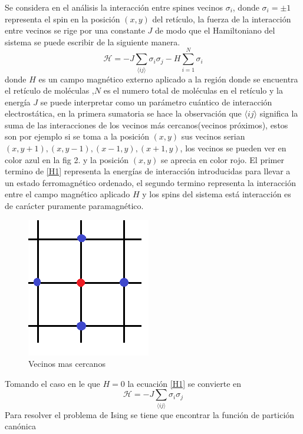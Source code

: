 \documentclass[a4paper]{article}
\begin{document}
Se considera en el análisis la interacción entre spines vecinos $\sigma_{i}$, donde $\sigma_i=\pm1$ representa el spin en la  posición $(x,y)$ del retículo, la fuerza de la interacción entre vecinos se rige por una constante $J$ de modo que el Hamiltoniano del sistema se puede escribir de la siguiente manera.
\begin{equation}
\label{H1}
\mathcal{H}=-J\sum_{\langle i j\rangle}\sigma_i \sigma_j-H\sum_{i=1}^{N}\sigma_i
\end{equation}
donde $H$ es un campo magnético externo aplicado a la región donde se encuentra el retículo de moléculas ,$N$ es el numero total de moléculas en el retículo y la energía $J$ se puede interpretar como un parámetro cuántico de interacción electrostática, en la primera sumatoria se hace la observación que $\langle i j\rangle$ significa la suma de las interacciones de los vecinos más cercanos(vecinos próximos), estos son por ejemplo si se toma a la posición $(x,y)$ sus vecinos serian ${(x,y+1),(x,y-1),(x-1,y),(x+1,y)}$, los vecinos se pueden ver en color azul en la fig 2. y la posición $(x,y)$ se aprecia en color rojo. El primer termino de \ref{H1} representa la energías de interacción introducidas para llevar a un estado ferromagnético ordenado, el segundo termino representa la interacción entre el campo magnético aplicado $H$ y los spins del sistema está interacción es de carácter puramente paramagnético.
\begin{figure}[H]
\begin{center}
\includegraphics[scale=0.4]{Neighbor.png} 
\end{center} 
\caption{Vecinos mas cercanos}
\end{figure}
Tomando el caso en le que $H=0$ la ecuación \ref{H1} se convierte en 
\begin{equation}
\label{H2}
\mathcal{H}=-J\sum_{\langle i j\rangle}\sigma_i \sigma_j
\end{equation}
Para resolver el problema de Ising se tiene que encontrar la función de partición canónica
\end{document}
